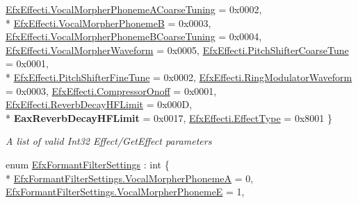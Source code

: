 \begin{DoxyCompactItemize}
\hyperlink{namespace_open_t_k_1_1_audio_1_1_open_a_l_a49039c1ddcb53675576ad2780fc50315acf3162c231448b3b78a87df7cd2ce10e}{Efx\-Effecti.\-Vocal\-Morpher\-Phoneme\-A\-Coarse\-Tuning} = 0x0002, 
\\*
\hyperlink{namespace_open_t_k_1_1_audio_1_1_open_a_l_a49039c1ddcb53675576ad2780fc50315ababc954538a26ac831e01c91429bd1f2}{Efx\-Effecti.\-Vocal\-Morpher\-Phoneme\-B} = 0x0003, 
\hyperlink{namespace_open_t_k_1_1_audio_1_1_open_a_l_a49039c1ddcb53675576ad2780fc50315ac3804e7cc50143b7674ab67b5bd75b3b}{Efx\-Effecti.\-Vocal\-Morpher\-Phoneme\-B\-Coarse\-Tuning} = 0x0004, 
\hyperlink{namespace_open_t_k_1_1_audio_1_1_open_a_l_a49039c1ddcb53675576ad2780fc50315a30b0d8252fa5fea0dd9e4004f682f76e}{Efx\-Effecti.\-Vocal\-Morpher\-Waveform} = 0x0005, 
\hyperlink{namespace_open_t_k_1_1_audio_1_1_open_a_l_a49039c1ddcb53675576ad2780fc50315afc08bedfeffc3efd9de80c41b32fa849}{Efx\-Effecti.\-Pitch\-Shifter\-Coarse\-Tune} = 0x0001, 
\\*
\hyperlink{namespace_open_t_k_1_1_audio_1_1_open_a_l_a49039c1ddcb53675576ad2780fc50315a8d7b0cbfb9cbdf21825130b9d55bb095}{Efx\-Effecti.\-Pitch\-Shifter\-Fine\-Tune} = 0x0002, 
\hyperlink{namespace_open_t_k_1_1_audio_1_1_open_a_l_a49039c1ddcb53675576ad2780fc50315ac8549df97c5cf6e58d3ee3ba4bd1b22c}{Efx\-Effecti.\-Ring\-Modulator\-Waveform} = 0x0003, 
\hyperlink{namespace_open_t_k_1_1_audio_1_1_open_a_l_a49039c1ddcb53675576ad2780fc50315a6ae6a251fe23f9192a6e6f752f13e442}{Efx\-Effecti.\-Compressor\-Onoff} = 0x0001, 
\hyperlink{namespace_open_t_k_1_1_audio_1_1_open_a_l_a49039c1ddcb53675576ad2780fc50315a34438d64d0ae5f59d0012931f284f9da}{Efx\-Effecti.\-Reverb\-Decay\-H\-F\-Limit} = 0x000\-D, 
\\*
{\bfseries Eax\-Reverb\-Decay\-H\-F\-Limit} = 0x0017, 
\hyperlink{namespace_open_t_k_1_1_audio_1_1_open_a_l_a49039c1ddcb53675576ad2780fc50315af1157e86fb1ebe840624faacdc0a17f5}{Efx\-Effecti.\-Effect\-Type} = 0x8001
 \}
\begin{DoxyCompactList}\small\item\em A list of valid Int32 Effect/\-Get\-Effect parameters\end{DoxyCompactList}\item 
enum \hyperlink{namespace_open_t_k_1_1_audio_1_1_open_a_l_a6c49388702d57d780ffe0f4690e84f49}{Efx\-Formant\-Filter\-Settings} \-: int \{ \\*
\hyperlink{namespace_open_t_k_1_1_audio_1_1_open_a_l_a6c49388702d57d780ffe0f4690e84f49a1e1a85b0d302670bf80cc1e2b9b7eca8}{Efx\-Formant\-Filter\-Settings.\-Vocal\-Morpher\-Phoneme\-A} = 0, 
\hyperlink{namespace_open_t_k_1_1_audio_1_1_open_a_l_a6c49388702d57d780ffe0f4690e84f49a7ce373e0023dbdfc4b32410797a44ead}{Efx\-Formant\-Filter\-Settings.\-Vocal\-Morpher\-Phoneme\-E} = 1, 

\end{DoxyCompactItemize}
